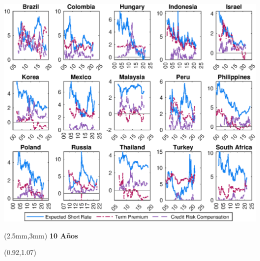 \documentclass[12pt, aspectratio=169, xcolor=dvipsnames]{beamer}
\begin{document}
\begin{frame}[label=YldDcmp10]
\begin{center}							%
	\includegraphics[trim={0cm 0cm 0cm 0cm},clip,height=0.95\textheight,width=\linewidth]{../Figures/Estimation/ny_dcmp.eps} \\
\end{center}
\begin{textblock*}{15cm}(2.5mm,3mm)
	\textbf{10 Años}
\end{textblock*}
\begin{textblock*}{5cm}(0.92\textwidth,1.07\textheight)
	\hyperlink{YldDcmp2}{}
\end{textblock*}
\end{frame}

\end{document}
